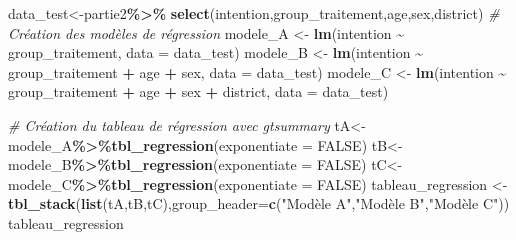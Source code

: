 \documentclass[
]{article}
\newenvironment{Shaded}{\begin{snugshade}}{\end{snugshade}}
\newcommand{\AttributeTok}[1]{\textcolor[rgb]{0.13,0.29,0.53}{#1}}
\newcommand{\CommentTok}[1]{\textcolor[rgb]{0.56,0.35,0.01}{\textit{#1}}}
\newcommand{\ConstantTok}[1]{\textcolor[rgb]{0.56,0.35,0.01}{#1}}
\newcommand{\FunctionTok}[1]{\textcolor[rgb]{0.13,0.29,0.53}{\textbf{#1}}}
\newcommand{\NormalTok}[1]{#1}
\newcommand{\OtherTok}[1]{\textcolor[rgb]{0.56,0.35,0.01}{#1}}
\newcommand{\SpecialCharTok}[1]{\textcolor[rgb]{0.81,0.36,0.00}{\textbf{#1}}}
\newcommand{\StringTok}[1]{\textcolor[rgb]{0.31,0.60,0.02}{#1}}
\begin{document}
\begin{Shaded}
\begin{Highlighting}[]
\NormalTok{data\_test}\OtherTok{\textless{}{-}}\NormalTok{partie2}\SpecialCharTok{\%\textgreater{}\%} \FunctionTok{select}\NormalTok{(intention,group\_traitement,age,sex,district)}
\CommentTok{\# Création des modèles de régression}
\NormalTok{modele\_A }\OtherTok{\textless{}{-}} \FunctionTok{lm}\NormalTok{(intention }\SpecialCharTok{\textasciitilde{}}\NormalTok{ group\_traitement, }\AttributeTok{data =}\NormalTok{ data\_test)}
\NormalTok{modele\_B }\OtherTok{\textless{}{-}} \FunctionTok{lm}\NormalTok{(intention }\SpecialCharTok{\textasciitilde{}}\NormalTok{ group\_traitement }\SpecialCharTok{+}\NormalTok{ age }\SpecialCharTok{+}\NormalTok{ sex, }\AttributeTok{data =}\NormalTok{ data\_test)}
\NormalTok{modele\_C }\OtherTok{\textless{}{-}} \FunctionTok{lm}\NormalTok{(intention }\SpecialCharTok{\textasciitilde{}}\NormalTok{ group\_traitement }\SpecialCharTok{+}\NormalTok{ age }\SpecialCharTok{+}\NormalTok{ sex }\SpecialCharTok{+}\NormalTok{ district,}
               \AttributeTok{data =}\NormalTok{ data\_test)}

\CommentTok{\# Création du tableau de régression avec gtsummary}
\NormalTok{tA}\OtherTok{\textless{}{-}}\NormalTok{modele\_A}\SpecialCharTok{\%\textgreater{}\%}\FunctionTok{tbl\_regression}\NormalTok{(}\AttributeTok{exponentiate =} \ConstantTok{FALSE}\NormalTok{)}
\NormalTok{tB}\OtherTok{\textless{}{-}}\NormalTok{modele\_B}\SpecialCharTok{\%\textgreater{}\%}\FunctionTok{tbl\_regression}\NormalTok{(}\AttributeTok{exponentiate =} \ConstantTok{FALSE}\NormalTok{)}
\NormalTok{tC}\OtherTok{\textless{}{-}}\NormalTok{modele\_C}\SpecialCharTok{\%\textgreater{}\%}\FunctionTok{tbl\_regression}\NormalTok{(}\AttributeTok{exponentiate =} \ConstantTok{FALSE}\NormalTok{)}
\NormalTok{tableau\_regression }\OtherTok{\textless{}{-}} \FunctionTok{tbl\_stack}\NormalTok{(}\FunctionTok{list}\NormalTok{(tA,tB,tC),}\AttributeTok{group\_header=}\FunctionTok{c}\NormalTok{(}\StringTok{"Modèle A"}\NormalTok{,}\StringTok{"Modèle B"}\NormalTok{,}\StringTok{"Modèle C"}\NormalTok{))}
\NormalTok{tableau\_regression}
\end{Highlighting}
\end{Shaded}
\end{document}
